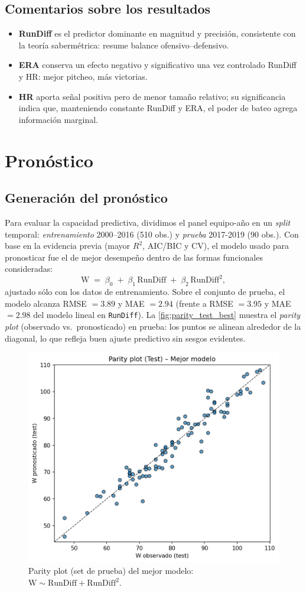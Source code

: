 \documentclass[man,floatsintext]{apa7}
\begin{document}
\subsection{Comentarios sobre los resultados}
\begin{itemize}
    \item \textbf{RunDiff} es el predictor dominante en magnitud y precisión, consistente con la teoría sabermétrica: resume balance ofensivo--defensivo.
    \item \textbf{ERA} conserva un efecto negativo y significativo una vez controlado RunDiff y HR: mejor pitcheo, más victorias.
    \item \textbf{HR} aporta señal positiva pero de menor tamaño relativo; su significancia indica que, manteniendo constante RunDiff y ERA, el poder de bateo agrega información marginal.
\end{itemize}
\section{Pronóstico}
\subsection{Generación del pronóstico}
Para evaluar la capacidad predictiva, dividimos el panel equipo-año en un \textit{split} temporal:
\emph{entrenamiento} 2000–2016 (510 obs.) y \emph{prueba} 2017-2019 (90 obs.). Con base en la evidencia previa (mayor $R^2$, AIC/BIC y CV), el modelo usado para 
pronosticar fue el de mejor desempeño dentro de las formas funcionales consideradas:
\[
\text{W} \;=\; \beta_0 \;+\; \beta_1\,\text{RunDiff}\;+\;\beta_2\,\text{RunDiff}^2,
\]
ajustado sólo con los datos de entrenamiento. Sobre el conjunto de prueba, el modelo alcanza
RMSE \(=3.89\) y MAE \(=2.94\) (frente a RMSE \(=3.95\) y MAE \(=2.98\) del modelo lineal en \texttt{RunDiff}).
La \autoref{fig:parity_test_best} muestra el \textit{parity plot} (observado vs.\ pronosticado) en prueba:
los puntos se alinean alrededor de la diagonal, lo que refleja buen ajuste predictivo sin sesgos evidentes.

\begin{figure}[H]
    \centering
    \includegraphics[width=0.5\linewidth]{../plots/forecast_parity_test_best.png}
    \caption{Parity plot (set de prueba) del mejor modelo: \( \text{W} \sim \text{RunDiff} + \text{RunDiff}^2 \).}
    \label{fig:parity_test_best}
\end{figure}
\end{document}
